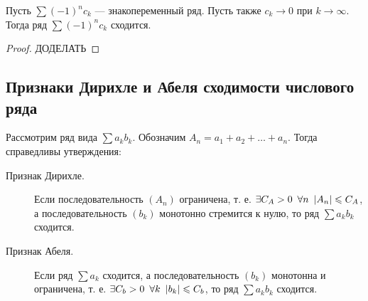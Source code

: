 \begin{theorem}
	Пусть \(\sum (-1)^n c_k\) --- знакопеременный ряд. Пусть также \(c_k \to 0\) при  \(k \to \infty\). Тогда ряд \(\sum (-1)^n c_k\) сходится.
\end{theorem}
\begin{proof}
	ДОДЕЛАТЬ
\end{proof}

\subsection{Признаки Дирихле и Абеля сходимости числового ряда}

\begin{theorem}
	Рассмотрим ряд вида \(\sum a_k b_k\). Обозначим \(A_n = a_1 + a_2 + \ldots + a_n\). Тогда справедливы утверждения:
	\begin{description}
		\item[Признак Дирихле.] Если последовательность \((A_n)\) ограничена, т. е. \(\exists C_A > 0 \enskip \forall n \enskip |A_n| \leqslant C_A\), а последовательность \((b_k)\) монотонно стремится к нулю, то ряд \(\sum a_k b_k\) сходится.
		\item[Признак Абеля.] Если ряд \(\sum a_k\) сходится, а последовательность \((b_k)\) монотонна и ограничена, т. е.  \(\exists C_b > 0 \enskip \forall k \enskip |b_k| \leqslant C_b\), то ряд \(\sum a_k b_k\) сходится.
	\end{description}
\end{theorem}
